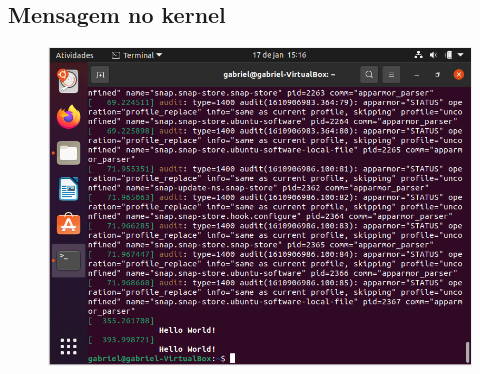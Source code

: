 \documentclass[12pt, a4paper]{article}
\begin{document}
    \subsection{Mensagem no kernel}
    
    \begin{figure}[hbp!]
        \includegraphics[width=12cm]{img/mensagem_kernel.png}
        \centering
    \end{figure}
	
\end{document}
